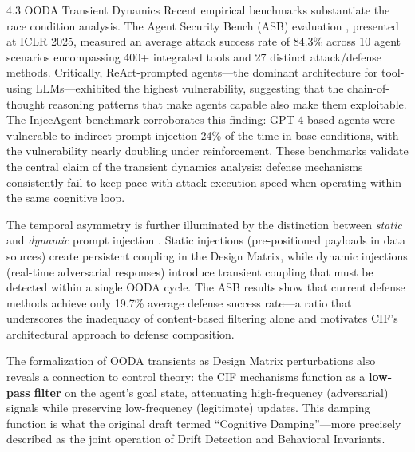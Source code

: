 \documentclass[
  ignorenonframetext,
]{beamer}
\begin{document}
\begin{frame}[allowframebreaks]{4.3 OODA Transient Dynamics}
Recent empirical benchmarks substantiate the race condition analysis.
The Agent Security Bench (ASB) evaluation \cite{zhang2025asb}, presented
at ICLR 2025, measured an average attack success rate of 84.3\% across
10 agent scenarios encompassing 400+ integrated tools and 27 distinct
attack/defense methods. Critically, ReAct-prompted agents---the dominant
architecture for tool-using LLMs---exhibited the highest vulnerability,
suggesting that the chain-of-thought reasoning patterns that make agents
capable also make them exploitable. The InjecAgent benchmark
\cite{zhan2024injecagent} corroborates this finding: GPT-4-based agents
were vulnerable to indirect prompt injection 24\% of the time in base
conditions, with the vulnerability nearly doubling under reinforcement.
These benchmarks validate the central claim of the transient dynamics
analysis: defense mechanisms consistently fail to keep pace with attack
execution speed when operating within the same cognitive loop.

The temporal asymmetry is further illuminated by the distinction between
\emph{static} and \emph{dynamic} prompt injection
\cite{liu2024formalizing}. Static injections (pre-positioned payloads in
data sources) create persistent coupling in the Design Matrix, while
dynamic injections (real-time adversarial responses) introduce transient
coupling that must be detected within a single OODA cycle. The ASB
results show that current defense methods achieve only 19.7\% average
defense success rate---a ratio that underscores the inadequacy of
content-based filtering alone and motivates CIF's architectural approach
to defense composition.

The formalization of OODA transients as Design Matrix perturbations also
reveals a connection to control theory: the CIF mechanisms function as a
\textbf{low-pass filter} on the agent's goal state, attenuating
high-frequency (adversarial) signals while preserving low-frequency
(legitimate) updates. This damping function is what the original draft
termed ``Cognitive Damping''---more precisely described as the joint
operation of Drift Detection and Behavioral Invariants.
\end{frame}
\end{document}

